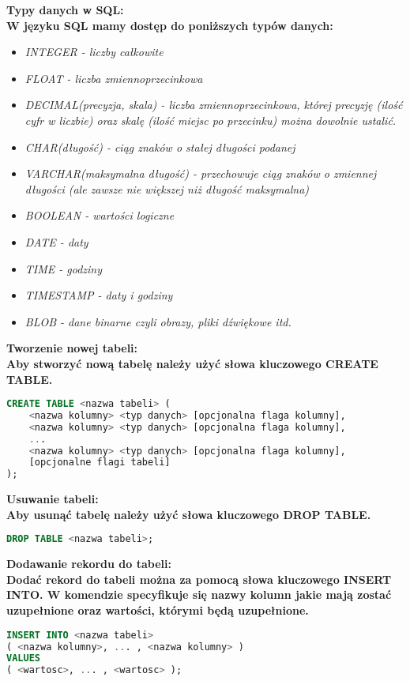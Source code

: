 \documentclass[a4paper,12pt]{article}
\newcommand{\h}[1]{\noindent \bf #1 \rm \\ \noindent}
\newcommand{\italic}[1]{\it #1 \rm}
\begin{document}
\h{Typy danych w SQL:}
W języku SQL mamy dostęp do poniższych typów danych:
\begin{itemize}
	\item \italic{INTEGER} - liczby całkowite
	\item \italic{FLOAT} - liczba zmiennoprzecinkowa
	\item \italic{DECIMAL(precyzja, skala)} - liczba zmiennoprzecinkowa, której precyzję (ilość cyfr w liczbie) oraz skalę (ilość miejsc po przecinku) można dowolnie ustalić.
	\item \italic{CHAR(długość)} - ciąg znaków o stałej długości podanej 
	\item \italic{VARCHAR(maksymalna długość)} - przechowuje ciąg znaków o zmiennej długości (ale zawsze nie większej niż długość maksymalna)
	\item \italic{BOOLEAN} - wartości logiczne
	\item \italic{DATE} - daty
	\item \italic{TIME} - godziny
	\item \italic{TIMESTAMP} - daty i godziny
	\item \italic{BLOB} - dane binarne czyli obrazy, pliki dźwiękowe itd. 
\end{itemize} 
\vspace{5mm}

\h{Tworzenie nowej tabeli:}
Aby stworzyć nową tabelę należy użyć słowa kluczowego CREATE TABLE.

\begin{lstlisting}[language=SQL]
CREATE TABLE <nazwa tabeli> (
	<nazwa kolumny> <typ danych> [opcjonalna flaga kolumny],
	<nazwa kolumny> <typ danych> [opcjonalna flaga kolumny],
	...
	<nazwa kolumny> <typ danych> [opcjonalna flaga kolumny],
	[opcjonalne flagi tabeli]
);
\end{lstlisting}
\vspace{5mm}

\h{Usuwanie tabeli:}
Aby usunąć tabelę należy użyć słowa kluczowego DROP TABLE.
\begin{lstlisting}[language=SQL]
DROP TABLE <nazwa tabeli>;
\end{lstlisting}
\vspace{5mm}

\h{Dodawanie rekordu do tabeli:}
Dodać rekord do tabeli można za pomocą słowa kluczowego INSERT INTO. W komendzie specyfikuje się nazwy kolumn jakie mają zostać uzupełnione oraz wartości, którymi będą uzupełnione.
\begin{lstlisting}[language=SQL]
INSERT INTO <nazwa tabeli> 
( <nazwa kolumny>, ... , <nazwa kolumny> )
VALUES 
( <wartosc>, ... , <wartosc> );
\end{lstlisting}
\vspace{5mm}
\end{document}
